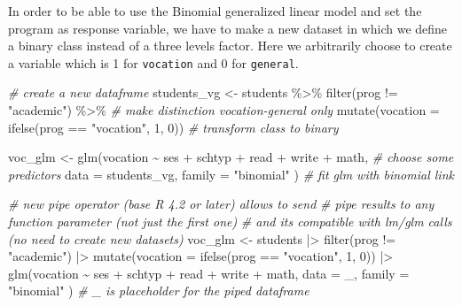 \documentclass[
  oneside]{book}
\newenvironment{Shaded}{\begin{snugshade}}{\end{snugshade}}
\newcommand{\AttributeTok}[1]{\textcolor[rgb]{0.77,0.63,0.00}{#1}}
\newcommand{\CommentTok}[1]{\textcolor[rgb]{0.56,0.35,0.01}{\textit{#1}}}
\newcommand{\DecValTok}[1]{\textcolor[rgb]{0.00,0.00,0.81}{#1}}
\newcommand{\FunctionTok}[1]{\textcolor[rgb]{0.00,0.00,0.00}{#1}}
\newcommand{\NormalTok}[1]{#1}
\newcommand{\OtherTok}[1]{\textcolor[rgb]{0.56,0.35,0.01}{#1}}
\newcommand{\SpecialCharTok}[1]{\textcolor[rgb]{0.00,0.00,0.00}{#1}}
\newcommand{\StringTok}[1]{\textcolor[rgb]{0.31,0.60,0.02}{#1}}
\begin{document}
In order to be able to use the Binomial generalized linear model
and set the program as response variable, we have to make a new
dataset in which we define a binary class instead of a three levels
factor. Here we arbitrarily choose to create a variable which is
1 for \texttt{vocation} and 0 for \texttt{general}.

\begin{Shaded}
\begin{Highlighting}[]
\CommentTok{\# create a new dataframe}
\NormalTok{students\_vg }\OtherTok{\textless{}{-}}\NormalTok{ students }\SpecialCharTok{\%\textgreater{}\%}
  \FunctionTok{filter}\NormalTok{(prog }\SpecialCharTok{!=} \StringTok{"academic"}\NormalTok{) }\SpecialCharTok{\%\textgreater{}\%} \CommentTok{\# make distinction vocation{-}general only}
  \FunctionTok{mutate}\NormalTok{(}\AttributeTok{vocation =} \FunctionTok{ifelse}\NormalTok{(prog }\SpecialCharTok{==} \StringTok{"vocation"}\NormalTok{, }\DecValTok{1}\NormalTok{, }\DecValTok{0}\NormalTok{)) }\CommentTok{\# transform class to binary}

\NormalTok{voc\_glm }\OtherTok{\textless{}{-}} \FunctionTok{glm}\NormalTok{(vocation }\SpecialCharTok{\textasciitilde{}}\NormalTok{ ses }\SpecialCharTok{+}\NormalTok{ schtyp }\SpecialCharTok{+}\NormalTok{ read }\SpecialCharTok{+}\NormalTok{ write }\SpecialCharTok{+}\NormalTok{ math, }\CommentTok{\# choose some predictors}
  \AttributeTok{data =}\NormalTok{ students\_vg, }\AttributeTok{family =} \StringTok{"binomial"}
\NormalTok{) }\CommentTok{\# fit glm with binomial link}
\end{Highlighting}
\end{Shaded}

\begin{Shaded}
\begin{Highlighting}[]
\CommentTok{\# new pipe operator (base R 4.2 or later) allows to send}
\CommentTok{\# pipe results to any function parameter (not just the first one)}
\CommentTok{\# and it\textquotesingle{}s compatible with lm/glm calls (no need to create new datasets)}
\NormalTok{voc\_glm }\OtherTok{\textless{}{-}}\NormalTok{ students }\SpecialCharTok{|\textgreater{}}
  \FunctionTok{filter}\NormalTok{(prog }\SpecialCharTok{!=} \StringTok{"academic"}\NormalTok{) }\SpecialCharTok{|\textgreater{}}
  \FunctionTok{mutate}\NormalTok{(}\AttributeTok{vocation =} \FunctionTok{ifelse}\NormalTok{(prog }\SpecialCharTok{==} \StringTok{"vocation"}\NormalTok{, }\DecValTok{1}\NormalTok{, }\DecValTok{0}\NormalTok{)) }\SpecialCharTok{|\textgreater{}}
  \FunctionTok{glm}\NormalTok{(vocation }\SpecialCharTok{\textasciitilde{}}\NormalTok{ ses }\SpecialCharTok{+}\NormalTok{ schtyp }\SpecialCharTok{+}\NormalTok{ read }\SpecialCharTok{+}\NormalTok{ write }\SpecialCharTok{+}\NormalTok{ math,}
    \AttributeTok{data =}\NormalTok{ \_, }\AttributeTok{family =} \StringTok{"binomial"}
\NormalTok{  )}
\CommentTok{\# \textasciigrave{}\_\textasciigrave{} is placeholder for the piped dataframe}
\end{Highlighting}
\end{Shaded}
\end{document}
